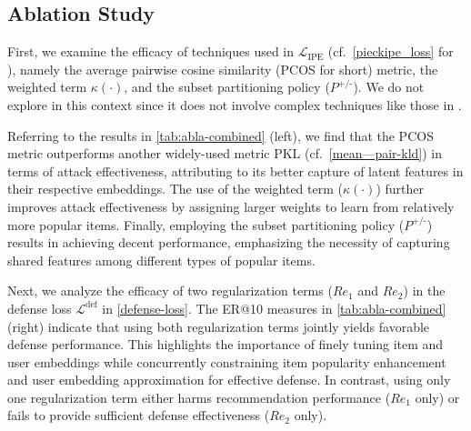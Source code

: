 \subsection{Ablation Study} \label{ssec:ablation_study}

First, we examine the efficacy of techniques used in $\mathcal{L}_\text{IPE}$ (cf.\ \cref{pieckipe_loss} for \modelI{}), namely the average pairwise cosine similarity (PCOS for short) metric, the weighted term $\kappa(\cdot)$, and the subset partitioning policy (${P}^\text{+/-}$). We do not explore \modelII{} in this context since it does not involve complex techniques like those in \modelI{}.

Referring to the results in \cref{tab:abla-combined} (left), we find that the PCOS metric outperforms another widely-used metric PKL (cf.\ \cref{mean—pair-kld}) in terms of attack effectiveness, attributing to its better capture of latent features in their respective embeddings. 
The use of the weighted term ($\kappa(\cdot)$) further improves attack effectiveness by assigning larger weights to learn from relatively more popular items. 
Finally, employing the subset partitioning policy (${P}^\text{+/-}$) results in \modelI{} achieving decent performance, emphasizing the necessity of capturing shared features among different types of popular items.

Next, we analyze the efficacy of two regularization terms ($\mathit{Re}_{1}$ and $\mathit{Re}_{2}$) in the defense loss $\mathcal{L}^\text{def}$ in \cref{defense-loss}. 
The ER@10 measures in \cref{tab:abla-combined} (right) indicate that using both regularization terms jointly yields favorable defense performance. This highlights the importance of finely tuning item and user embeddings while concurrently constraining item popularity enhancement and user embedding approximation for effective defense.
In contrast, using only one regularization term either harms recommendation performance ($\mathit{Re}_1$ only) or fails to provide sufficient defense effectiveness ($\mathit{Re}_2$ only). 

